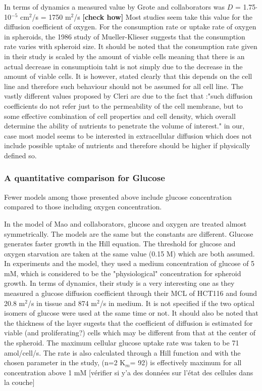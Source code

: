 \documentclass[11pt,a4paper]{article}
\begin{document}
In terms of dynamics a measured value by Grote and collaborators was $D$ = 1.75$\cdot$10$^{-5}$ cm$^2$/s = 1750 \textmu m$^2$/s \cite{Grote1977} \textbf{[check how]} 
Most studies seem take this value for the diffusion coefficient of oxygen. For the consumption rate or uptake rate of oxygen in spheroids, the 1986 study of Mueller-Klieser suggests that the consumption rate varies with spheroid size. It should be noted that the consumption rate given in their study is scaled by the amount of viable cells meaning that there is an actual decrease in consumptioin taht is not simply due to the decrease in the amount of viable cells. \cite{MullerKlieser1986}	 It is however, stated clearly that this depends on the cell line and therefore such behaviour should not be assumed for all cell line. The vastly different values proposed by Cleri are due to the fact that :"such diffusion coefficients do not refer just to the permeability of the cell membrane, but to some effective combination of cell properties and cell density, which overall determine the ability of nutrients to penetrate the volume of interest." in our, case most model seems to be interested in extracellular diffusion which does not include possible uptake of nutrients and therefore should be higher if physically defined so.

\subsubsection{A quantitative comparison for Glucose}
Fewer models among those presented above include glucose concentration compared to those including oxygen concentration.

In the model of Mao and collaborators, glucose and oxygen are treated almost symmetrically. The models are the same but the constants are different. Glucose generates faster growth in the Hill equation. The threshold for glucose and oxygen starvation are taken at the same value (0.15 \textmu M) which are both assumed.\cite{Mao2018} In experiments and the model, they used a medium concentration of glucose of 5 mM, which is considered to be the "physiological" concentration for spheroid growth.\cite{Freyer1986}\cite{Jagiella2016} In terms of dynamics, their study is a very interesting one as they measured a glucose diffusion coefficient through their MCL of HCT116 and found 20.8 \textmu m$^2$/s in tissue and 874 \textmu m$^2$/s in medium. It is not specified if the two optical isomers of glucose were used at the same time or not. It should also be noted that the thickness of the layer sugests that the coefficient of diffusion is estimated for viable (and proliferating?) cells which may be different from that at the center of the spheroid. The maximum cellular glucose uptake rate was taken to be 71 amol/cell/s.  The rate is also calculated through a Hill function and with the chosen parameter in the study, (n=2 K$_m$= 92) is effectively maximum for all concentration above 1 mM [vérifier si y'a des données sur l'état des cellules dans la couche]
\end{document}
